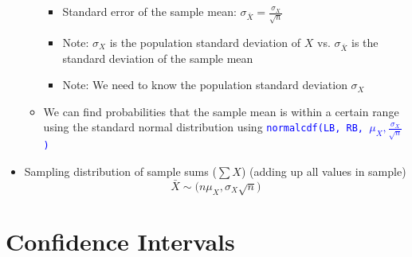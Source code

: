 \documentclass{article}
\begin{document}
\begin{itemize}
\begin{itemize}
			\begin{itemize}
				\item Standard error of the sample mean: $\sigma_{\bar{X}}=\frac{\sigma_X}{\sqrt{n}}$
				\item Note: $\sigma_X$ is the population standard deviation of $X$ vs. $\sigma_{\bar{X}}$ is the standard deviation of the sample mean
				\item Note: We need to know the population standard deviation $\sigma_X$
			\end{itemize}
		\item We can find probabilities that the sample mean is within a certain range using the standard normal distribution using \textcolor{blue}{\texttt{normalcdf(LB, RB, $\mu_X, \frac{\sigma_X}{\sqrt{n}}$)}}
		\end{itemize}
		\item Sampling distribution of sample sums ($\sum X$) (adding up all values in sample)
				\begin{equation*}
				\bar{X} \sim \bigg(n\mu_X, \sigma_X \sqrt{n}\bigg)
				\end{equation*}
	\end{itemize}

\clearpage 

\section{Confidence Intervals}
\end{document}
